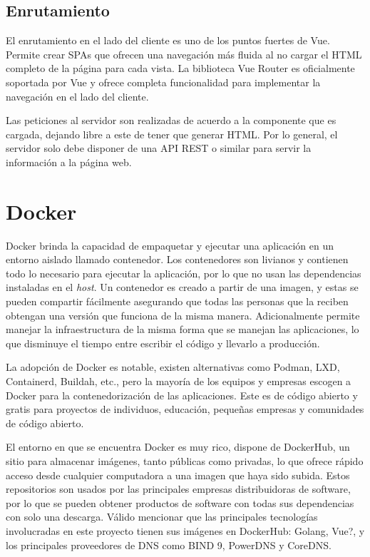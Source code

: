 \subsection{Enrutamiento} 

El enrutamiento en el lado del cliente es uno de los puntos fuertes de Vue. Permite crear SPAs que ofrecen una navegación más fluida al no cargar el HTML completo de la página para cada vista. La biblioteca Vue Router es oficialmente soportada por Vue y ofrece completa funcionalidad para implementar la navegación en el lado del cliente.

Las peticiones al servidor son realizadas de acuerdo a la componente que es cargada, dejando libre a este de tener que generar HTML. Por lo general, el servidor solo debe disponer de una API REST o similar para servir la información a la página web.

\section{Docker}

Docker brinda la capacidad de empaquetar y ejecutar una aplicación en un entorno aislado llamado contenedor. Los contenedores son livianos y contienen todo lo necesario para ejecutar la aplicación, por lo que no usan las dependencias instaladas en el \textit{host}. Un contenedor es creado a partir de una imagen, y estas se pueden compartir fácilmente asegurando que todas las personas que la reciben obtengan una versión que funciona de la misma manera. Adicionalmente permite manejar la infraestructura de la misma forma que se manejan las aplicaciones, lo que disminuye el tiempo entre escribir el código y llevarlo a producción.

La adopción de Docker es notable, existen alternativas como Podman, LXD, Containerd, Buildah, etc., pero la mayoría de los equipos y empresas escogen a Docker para la contenedorización de las aplicaciones. Este es de código abierto y gratis para proyectos de individuos, educación, pequeñas empresas y comunidades de código abierto.

El entorno en que se encuentra Docker es muy rico, dispone de DockerHub, un sitio para almacenar imágenes, tanto públicas como privadas, lo que ofrece rápido acceso desde cualquier computadora a una imagen que haya sido subida. Estos repositorios son usados por las principales empresas distribuidoras de software, por lo que se pueden obtener productos de software con todas sus dependencias con solo una descarga. Válido mencionar que las principales tecnologías involucradas en este proyecto tienen sus imágenes en DockerHub: Golang, Vue?, y los principales proveedores de DNS como BIND 9, PowerDNS y CoreDNS.


